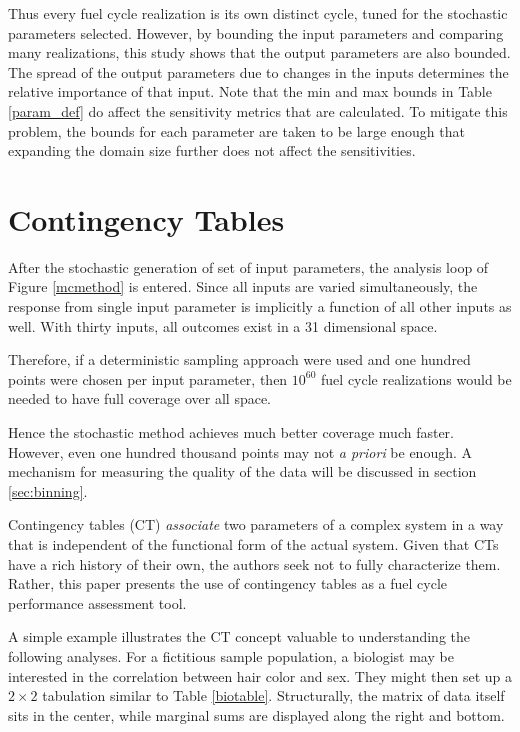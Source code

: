 \documentclass[preprint,12pt]{elsarticle}
\begin{document}
Thus every fuel cycle realization is its own distinct cycle, tuned for the stochastic parameters selected.
However, by bounding the input parameters and comparing many realizations, this study shows that the
output parameters are also bounded.  The spread of the output parameters due to changes in the inputs
determines the relative importance of that input.  Note that the min and max bounds
in Table \ref{param_def} do affect the sensitivity metrics that are calculated.
To mitigate this problem, the bounds for each parameter are taken to be 
large enough that expanding the domain size further does not affect the sensitivities.


%
%



\section{Contingency Tables}
\label{sec:ct}

After the stochastic generation of set of input parameters, the analysis loop of Figure \ref{mcmethod} is entered.
Since all inputs are varied simultaneously, the response from single input parameter is implicitly
a function of all other inputs as well.  With thirty inputs, all outcomes exist in a 31 dimensional space.

Therefore, if a deterministic sampling approach were used and one hundred points
were chosen per input parameter, then $10^{60}$ fuel cycle realizations would be 
needed to have full coverage over all space.

Hence the stochastic method achieves much better coverage much faster.  However, 
even one hundred thousand points may not \emph{a priori} be enough.  A mechanism 
for measuring the quality of the data will be discussed in section \ref{sec:binning}.

Contingency tables (CT) \cite{Everitt1992,Press2007,Yao2003} \emph{associate} two parameters of a
complex system in a way that is independent of the functional form of the actual system.
Given that CTs have a rich history of their own, the authors seek not to fully characterize them.  
Rather, this paper presents the use of contingency tables as a fuel cycle performance assessment tool.

A simple example illustrates the CT concept valuable to understanding the following analyses.  For a 
fictitious sample population, a biologist may be interested in the correlation between hair color and sex.  
They might then set up a $2\times 2$ tabulation similar to Table \ref{biotable}.  Structurally, the matrix of 
data itself sits in the center, while marginal sums are displayed along the right and bottom.
\end{document}
